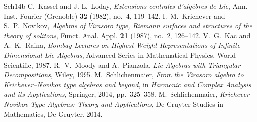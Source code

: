 \documentclass{amsart}
\theoremstyle{definition}
\theoremstyle{remark}
\numberwithin{equation}{section}
\begin{document}
\begin{thebibliography}{Sch14b}
C.~Kassel and J.-L.~Loday,
\emph{Extensions centrales d'alg\`ebres de Lie},
Ann. Inst. Fourier (Grenoble) \textbf{32} (1982), no.~4, 119--142.
I.~M.~Krichever and S.~P.~Novikov,
\emph{Algebras of {V}irasoro type, {R}iemann surfaces and structures of
the theory of solitons},
Funct. Anal. Appl. \textbf{21} (1987), no.~2, 126--142.
V.~G.~Kac and A.~K.~Raina,
\emph{Bombay Lectures on Highest Weight Representations of Infinite
Dimensional Lie Algebras},
Advanced Series in Mathematical Physics, World Scientific, 1987.
R.~V.~Moody and A.~Pianzola,
\emph{Lie Algebras with Triangular Decompositions},
Wiley, 1995.
M.~Schlichenmaier,
\emph{From the Virasoro algebra to Krichever--Novikov type algebras and
beyond},
in \emph{Harmonic and Complex Analysis and its Applications},
Springer, 2014, pp.~325--358.
M.~Schlichenmaier,
\emph{Krichever--Novikov Type Algebras: Theory and Applications},
De Gruyter Studies in Mathematics, De Gruyter, 2014.
\end{thebibliography}
\end{document}
